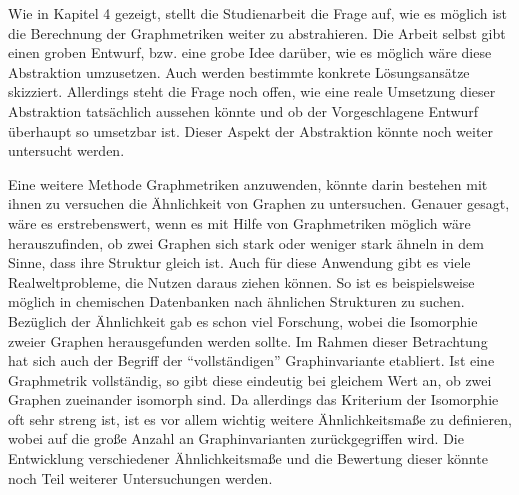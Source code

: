 \documentclass[a4paper,12pt,ngerman,chapterprefix=false,listof=totoc,bibliography=totoc]{scrreprt}
\begin{document}
{{{Wie in Kapitel 4 gezeigt, stellt die Studienarbeit die Frage auf, wie es möglich ist die Berechnung der Graphmetriken weiter zu abstrahieren. Die Arbeit selbst gibt einen groben Entwurf, bzw. eine grobe Idee darüber, wie es möglich wäre diese Abstraktion umzusetzen. Auch werden bestimmte konkrete Lösungsansätze skizziert. Allerdings steht die Frage noch offen, wie eine reale Umsetzung dieser Abstraktion tatsächlich aussehen könnte und ob der Vorgeschlagene Entwurf überhaupt so umsetzbar ist. Dieser Aspekt der Abstraktion könnte noch weiter untersucht werden.

Eine weitere Methode Graphmetriken anzuwenden, könnte darin bestehen mit ihnen zu versuchen die Ähnlichkeit von Graphen zu untersuchen. Genauer gesagt, wäre es erstrebenswert, wenn es mit Hilfe von Graphmetriken möglich wäre herauszufinden, ob zwei Graphen sich stark oder weniger stark ähneln in dem Sinne, dass ihre Struktur gleich ist. Auch für diese Anwendung gibt es viele Realweltprobleme, die Nutzen daraus ziehen können. So ist es beispielsweise möglich in chemischen Datenbanken nach ähnlichen Strukturen zu suchen. Bezüglich der Ähnlichkeit gab es schon viel Forschung, wobei die Isomorphie zweier Graphen herausgefunden werden sollte. Im Rahmen dieser Betrachtung hat sich auch der Begriff der "`vollständigen"' Graphinvariante etabliert. Ist eine Graphmetrik vollständig, so gibt diese eindeutig bei gleichem Wert an, ob zwei Graphen zueinander isomorph sind. Da allerdings das Kriterium der Isomorphie oft sehr streng ist, ist es vor allem wichtig weitere Ähnlichkeitsmaße zu definieren, wobei auf die große Anzahl an Graphinvarianten zurückgegriffen wird. Die Entwicklung verschiedener Ähnlichkeitsmaße und die Bewertung dieser könnte noch Teil weiterer Untersuchungen werden. \cite{dehmer_computational_2014,zager_graph_2008}
}
}}
\end{document}
